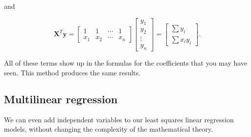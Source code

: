 \documentclass[
]{book}
\theoremstyle{definition}
\theoremstyle{definition}
\theoremstyle{definition}
\theoremstyle{definition}
\theoremstyle{remark}
\begin{document}
and

\[\mathbf{X}^T\mathbf{y}=\begin{bmatrix}1 & 1 & \cdots & 1\\x_1 & x_2 & \cdots & x_n\end{bmatrix}\begin{bmatrix}y_1\\y_2\\ \vdots \\y_n\end{bmatrix}=\begin{bmatrix} \sum y_i\\ \sum x_iy_i\end{bmatrix}.\]

All of these terms show up in the formulas for the coefficients that you may have seen. This method produces the same results.

\subsection*{Multilinear regression}\label{multilinear-regression}

We can even add independent variables to our least squares linear regression models, without changing the complexity of the mathematical theory.
\end{document}
